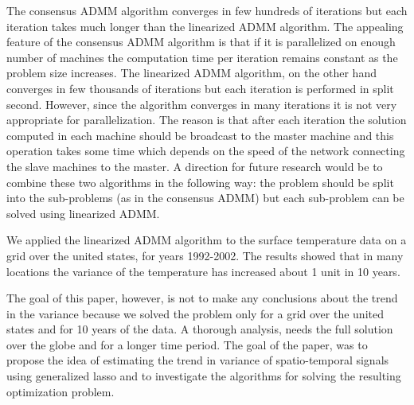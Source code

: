 \documentclass{article}
\begin{document}
The consensus ADMM algorithm converges in few hundreds of iterations but each iteration takes much longer than the linearized ADMM algorithm. The appealing feature of the consensus ADMM algorithm is that if it is parallelized on enough number of machines the computation time per iteration remains constant as the problem size increases. The linearized ADMM algorithm, on the other hand converges in few thousands of iterations but each iteration is performed in split second. However, since the algorithm converges in many iterations it is not very appropriate for parallelization. The reason is that after each iteration the solution computed in each machine should be broadcast to the master machine and this operation takes some time which depends on the speed of the network connecting the slave machines to the master. A direction for future research would be to combine these two algorithms in the following way: the problem should be split into the sub-problems (as in the consensus ADMM) but each sub-problem can be solved using linearized ADMM.

We applied the linearized ADMM algorithm to the surface temperature data on a grid over the united states, for years 1992-2002. The results showed that in many locations the variance of the temperature has increased about 1 unit in 10 years.

The goal of this paper, however, is not to make any conclusions about the trend in the variance because we solved the problem only for a grid over the united states and for 10 years of the data. A thorough analysis, needs the full solution over the globe and for a longer time period. The goal of the paper, was to propose the idea of estimating the trend in variance of spatio-temporal signals using generalized lasso and to investigate the algorithms for solving the resulting optimization problem.



\small

\end{document}
